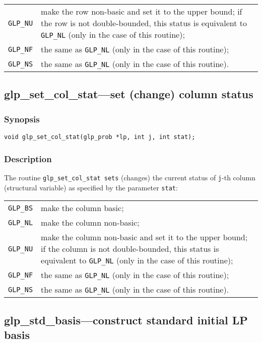 \begin{tabular}{@{}lp{104.2mm}@{}}
\verb|GLP_NU| & make the row non-basic and set it to the upper bound;
   if the row is not double-bounded, this status is equivalent to
   \verb|GLP_NL| (only in the case of this routine); \\
\verb|GLP_NF| & the same as \verb|GLP_NL| (only in the case of this
   routine); \\
\verb|GLP_NS| & the same as \verb|GLP_NL| (only in the case of this
   routine). \\
\end{tabular}

\subsection{glp\_set\_col\_stat---set (change) column status}

\subsubsection*{Synopsis}

\begin{verbatim}
void glp_set_col_stat(glp_prob *lp, int j, int stat);
\end{verbatim}

\subsubsection*{Description}

The routine \verb|glp_set_col_stat sets| (changes) the current status
of \verb|j|-th column (structural variable) as specified by the
parameter \verb|stat|:

\begin{tabular}{@{}lp{104.2mm}@{}}
\verb|GLP_BS| & make the column basic; \\
\verb|GLP_NL| & make the column non-basic; \\
\verb|GLP_NU| & make the column non-basic and set it to the upper
   bound; if the column is not double-bounded, this status is equivalent
   to \verb|GLP_NL| (only in the case of this routine); \\
\verb|GLP_NF| & the same as \verb|GLP_NL| (only in the case of this
   routine); \\
\verb|GLP_NS| & the same as \verb|GLP_NL| (only in the case of this
   routine).
\end{tabular}

\subsection{glp\_std\_basis---construct standard initial LP basis}


